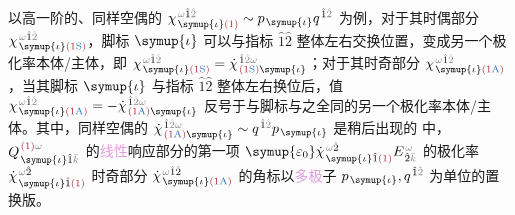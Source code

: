 以高一阶的、同样\textcolor{NavyBlue}{空偶}的 $\chi^{\;\! \mathcolor{gray}{\omega} \hat{1} \mathcolor{gray}{\hat{2}}}_{\;\! \symup{\iota} \textcolor{Maroon}{(1)}} \sim p_{\;\! \symup{\iota}} q^{\;\! \hat{1} \mathcolor{gray}{\hat{2}}}$ 为例，对于其\textcolor{NavyBlue}{时偶}部分$\chi^{\;\! \mathcolor{gray}{\omega} \hat{1} \mathcolor{gray}{\hat{2}}}_{\;\! \symup{\iota} \textcolor{Maroon}{(1\textcolor{NavyBlue}{\text{S}})}}$，脚标 $\symup{\iota}$ 可以与指标 $\hat{1} \hat{2}$ 整体左右交换位置，变成另一个极化率本体/主体，即 $\chi^{\;\! \mathcolor{gray}{\omega} \hat{1} \mathcolor{gray}{\hat{2}}}_{\;\! \symup{\iota} \textcolor{Maroon}{(1\textcolor{NavyBlue}{\text{S}})}} = \dot{\chi}^{\;\! \hat{1} \mathcolor{gray}{\hat{2}} \mathcolor{gray}{\omega} }_{\;\! \textcolor{Maroon}{(1\textcolor{NavyBlue}{\text{S}})} \symup{\iota}}$；对于其\textcolor{NavyBlue}{时奇}部分 $\chi^{\;\! \mathcolor{gray}{\omega} \hat{1} \mathcolor{gray}{\hat{2}}}_{\;\! \symup{\iota} \textcolor{Maroon}{(1\textcolor{NavyBlue}{\text{A}})}}$，当其脚标 $\symup{\iota}$ 与指标 $\hat{1} \hat{2}$ 整体左右换位后，值 $\chi^{\;\! \mathcolor{gray}{\omega} \hat{1} \mathcolor{gray}{\hat{2}}}_{\;\! \symup{\iota} \textcolor{Maroon}{(1\textcolor{NavyBlue}{\text{A}})}} = - \dot{\chi}^{\;\! \hat{1} \mathcolor{gray}{\hat{2}} \mathcolor{gray}{\omega} }_{\;\! \textcolor{Maroon}{(1\textcolor{NavyBlue}{\text{A}})} \symup{\iota}}$ 反号于与脚标与之全同的另一个极化率本体/主体\cite{raabMultipoleTheoryElectromagnetism2004}。其中，同样\textcolor{NavyBlue}{空偶}的 $\dot{\chi}^{\;\! \hat{1} \mathcolor{gray}{\hat{2}} \mathcolor{gray}{\omega} }_{\;\! \textcolor{Maroon}{(1\textcolor{NavyBlue}{\text{A}})} \symup{\iota}} \sim q^{\;\! \hat{1} \mathcolor{gray}{\hat{2}}} p_{\;\! \symup{\iota}}$ 是稍后出现的  中，$Q^{\;\! \textcolor{Maroon}{(1)} \mathcolor{gray}{\omega}}_{\;\! \symup{\iota} \hat{1} \mathcolor{gray}{\bar{k}}}$ 的\textcolor{Plum}{线性}响应部分的第一项 ${\symup{\varepsilon_0}} \dot{\chi}^{\;\! \mathcolor{gray}{\omega} \hat{2}}_{\;\! \symup{\iota} \hat{1} \textcolor{Maroon}{(1)}} E^{\;\!\mathcolor{gray}{\omega}}_{\;\! \hat{2} \mathcolor{gray}{\bar{k}}}$ 的极化率 $\dot{\chi}^{\;\! \mathcolor{gray}{\omega} \hat{2}}_{\;\! \symup{\iota} \hat{1} \textcolor{Maroon}{(1)}}$ \textcolor{NavyBlue}{时奇}部分 $\dot{\chi}^{\;\! \mathcolor{gray}{\omega} \hat{1} \hat{2}}_{\;\! \symup{\iota} \textcolor{Maroon}{(1\textcolor{NavyBlue}{\text{A}})}}$ 的角标以\textcolor{Plum}{多极}子 $p_{\;\! \symup{\iota}}, q^{\;\! \hat{1} \mathcolor{gray}{\hat{2}}}$ 为单位的置换版。

